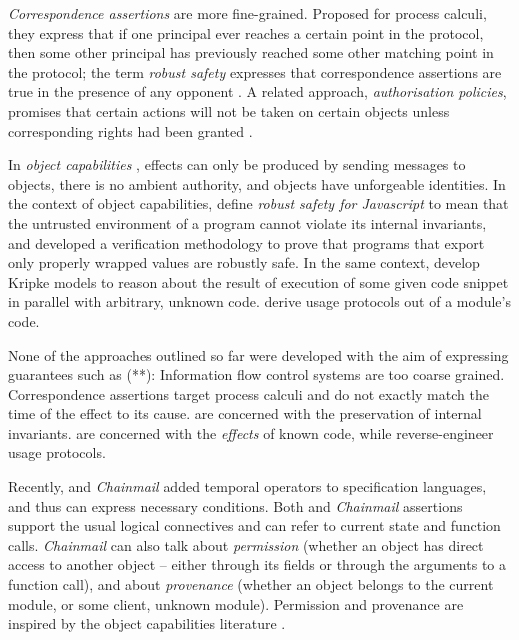\emph{Correspondence assertions} are more fine-grained. Proposed for 
process calculi, they %
{express}  that if one principal ever reaches a certain point in the protocol, 
then some other principal has previously reached some other matching point in the protocol; 
the term \emph{robust safety}  expresses that correspondence assertions are true in the presence of any opponent %
\cite{correspondence}. 
A related approach,  \emph{authorisation policies}, 
promises that certain actions will not be taken on certain objects
unless corresponding  rights had been granted  \cite{Maffeis:aiamb:thesis00}.

In   \emph{object capabilities} \cite{MillerPhD},
effects can only be produced by sending messages to objects,  there
is no ambient authority, and  objects 
have unforgeable identities.
In the context of object capabilities, \citeauthor{ddd} define  \emph{robust safety for Javascript}  
to mean that the untrusted environment of a program cannot violate 
its internal invariants, and developed  a verification methodology   to 
prove   that programs that  export only properly wrapped values  are robustly safe.
In the same context, \citeauthor{dd} develop Kripke models to reason about 
the result of execution of some given code snippet in parallel
with arbitrary, unknown code.  
 \cite{threoremsFreeSep} derive usage protocols out of a module's code.

{None} of the approaches outlined so far were developed with
 the aim of expressing guarantees such as (**):  
  Information flow control systems are too
 coarse grained. Correspondence assertions target process calculi and do not exactly match 
 the time of the effect to its cause. \citeauthor{ddd} are concerned with the preservation of
 internal invariants. \citeauthor{dd} are
 concerned with the \emph{effects} of known code,
 while \cite{threoremsFreeSep}  reverse-engineer usage protocols.
 
Recently,  {}  \cite{VerX}  and   \emph{Chainmail}  \cite{FASE} 
 added temporal operators to specification languages, and thus can express necessary conditions.  
 Both  {}  and   \emph{Chainmail} assertions support the usual 
   logical connectives and can refer to current state and function calls.
 \emph{Chainmail} 
 can also talk about \emph{permission} (whether an
 object has direct access to another object -- either through its fields or 
 through the arguments to a function call),  and about \emph{provenance} (whether an object
 belongs to the current module, or some client, unknown module).
Permission and provenance are inspired by the object capabilities
 literature \cite{MillerPhD}. 
 
